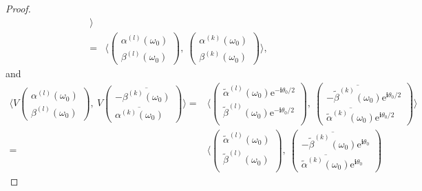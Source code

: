 \documentclass[10pt,a4paper]{amsart}
\begin{document}
\begin{proof}
\begin{equation*}
\begin{aligned}
    \rangle \\
     = & \langle
     \begin{pmatrix}
     	\alpha^{(l)}(\omega_0) \\
     	\beta^{(l)}(\omega_0)
     \end{pmatrix},\
       \begin{pmatrix}
     	\alpha^{(k)}(\omega_0) \\
     	\beta^{(k)}(\omega_0)
     \end{pmatrix}
     \rangle,
    \end{aligned}
    \end{equation*}
and
     \begin{equation*}
	\begin{aligned}
		\langle V
		\begin{pmatrix}
			\alpha^{(l)}(\omega_0) \\
			\beta^{(l)}(\omega_0)
		\end{pmatrix},\
		 V
		\begin{pmatrix}
			-\overline{\beta^{(k)}(\omega_0)} \\
			\overline{\alpha^{(k)}(\omega_0)}
		\end{pmatrix}
		\rangle
		= & \langle
		\begin{pmatrix}
			\widetilde{\alpha}^{(l)}(\omega_0)\mathrm{e}^{-\boldsymbol{i}\theta_0/2} \\
			\widetilde{\beta}^{(l)}(\omega_0)\mathrm{e}^{-\boldsymbol{i}\theta_0/2} \\
		\end{pmatrix},\
		\begin{pmatrix}
			-\overline{\widetilde{\beta}^{(k)}(\omega_0)}\mathrm{e}^{\boldsymbol{i}\theta_0/2} \\
			\overline{\widetilde{\alpha}^{(k)}(\omega_0)}\mathrm{e}^{\boldsymbol{i}\theta_0/2}
		\end{pmatrix}
		\rangle \\
		= &
		\langle
		\begin{pmatrix}
			\widetilde{\alpha}^{(l)}(\omega_0) \\
			\widetilde{\beta}^{(l)}(\omega_0)\\
		\end{pmatrix},\
		\begin{pmatrix}
			-\overline{\widetilde{\beta}^{(k)}(\omega_0)}\mathrm{e}^{\boldsymbol{i}\theta_0} \\
			\overline{\widetilde{\alpha}^{(k)}(\omega_0)}\mathrm{e}^{\boldsymbol{i}\theta_0}
		\end{pmatrix}

\end{aligned}
\end{equation*}
\end{proof}
\end{document}
